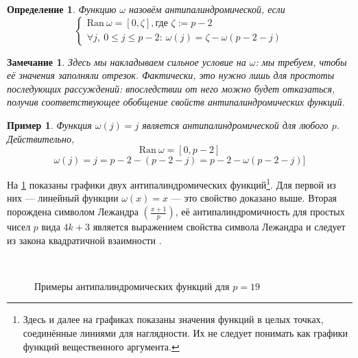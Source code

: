 \documentclass[14pt, a4paper, russian]{report}
\newtheorem{remark}{\indent Замечание}
\newtheorem{definition}{\indent Определение}
\newtheorem{example}{\indent Пример}
\begin{document}
\begin{definition}\label{antipalindromic}
Функцию $\omega$ назовём \emph{антипалиндромической}, если
\[\begin{cases}
	\mathrm{Ran }\ \omega = \left[0, \zeta\right], \text{где } \zeta := p-2 \\
	\forall j,\ 0 \le j \le p-2: \  \omega(j) = \zeta - \omega(p-2-j)
\end{cases}\]
\end{definition}
\begin{remark}
Здесь мы накладываем сильное условие на $\omega$: мы требуем, чтобы её значения заполняли отрезок. Фактически, это нужно лишь для простоты последующих рассуждений: впоследствии от него можно будет отказаться, получив соответствующее обобщение свойств антипалиндромических функций.
\end{remark}


\begin{example} \label{classic_omega}
Функция $\omega(j)=j$ является антипалиндромической для любого $p$. Действительно,
$$
\mathrm{Ran }\ \omega = \left[0, p-2\right]
$$
$$
\omega(j) = j = p-2 - (p-2-j) = p-2 - \omega(p-2-j)]
$$
\end{example}

На \cref{fig:antipalindromic} показаны графики двух антипалиндромических функций\footnote{Здесь и далее на графиках показаны значения функций в целых точках, соединённые линиями для наглядности. Их не следует понимать как графики функций вещественного аргумента.}. Для первой из них --- линейный функции $\omega(x)=x$ --- это свойство доказано выше. Вторая порождена символом Лежандра $(\frac{x+1}{p})$, её антипалиндромичность для простых чисел $p$ вида $4k+3$ является выражением свойства символа Лежандра и следует из закона квадратичной взаимности \cite{vinogradov}.

\begin{figure}[!h]
    \\
    \caption{\footnotesize{Примеры антипалиндромических функций для $p=19$}}
\label{fig:antipalindromic}
\end{figure}
\end{document}

